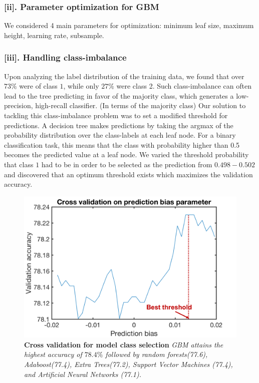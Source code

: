 \newpage

\subsubsection*{[ii]. Parameter optimization for GBM}
We considered 4 main parameters for optimization: minimum leaf size, maximum height, learning rate, subsample.

\newpage
\subsubsection*{[iii]. Handling class-imbalance}
Upon analyzing the label distribution of the training data, we found that over $73\%$ were of class $1$, while only $27\%$ were class 2. Such class-imbalance can often lead to the tree predicting in favor of the majority class, which generates a low-precision, high-recall classifier. (In terms of the majority class) Our solution to tackling this class-imbalance problem was to set a modified threshold for predictions. A decision tree makes predictions by taking the argmax of the probability distribution over the class-labels at each leaf node. For a binary classification task, this means that the class with probability higher than 0.5 becomes the predicted value at a leaf node. We varied the threshold probability that class $1$ had to be in order to be selected as the prediction from $0.498 - 0.502$ and discovered that an optimum threshold exists which maximizes the validation accuracy.

\begin{figure}[h]
\center
\includegraphics[scale=0.45]{figure4/figure4.png}
\caption{\textbf{Cross validation for model class selection} \textit{GBM attains the highest accuracy of $78.4\%$ followed by random forests(77.6), Adaboost(77.4), Extra Trees(77.2), Support Vector Machines (77.4), and Artificial Neural Networks (77.1).}}
\end{figure}

